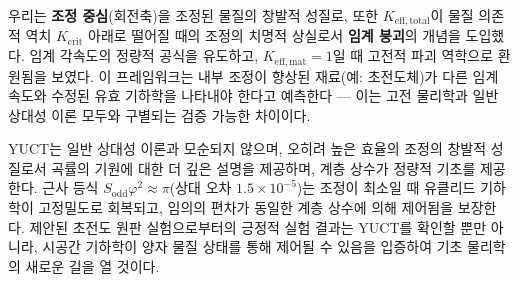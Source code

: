 \documentclass[12pt,a4paper]{article}
\newcommand{\Sodd}{S_{\mathrm{odd}}}
\newcommand{\Keffmat}{K_{\mathrm{eff,mat}}}
\newcommand{\Kefftot}{K_{\mathrm{eff,total}}}
\newcommand{\Kcrit}{K_{\mathrm{crit}}}
\begin{document}
	우리는 \textbf{조정 중심}(회전축)을 조정된 물질의 창발적 성질로, 또한 \(\Kefftot\)이 물질 의존적 역치 \(\Kcrit\) 아래로 떨어질 때의 조정의 치명적 상실로서 \textbf{임계 붕괴}의 개념을 도입했다. 임계 각속도의 정량적 공식을 유도하고, \(\Keffmat=1\)일 때 고전적 파괴 역학으로 환원됨을 보였다. 이 프레임워크는 내부 조정이 향상된 재료(예: 초전도체)가 다른 임계 속도와 수정된 유효 기하학을 나타내야 한다고 예측한다 — 이는 고전 물리학과 일반 상대성 이론 모두와 구별되는 검증 가능한 차이이다.
	
	YUCT는 일반 상대성 이론과 모순되지 않으며, 오히려 높은 효율의 조정의 창발적 성질로서 곡률의 기원에 대한 더 깊은 설명을 제공하며, 계층 상수가 정량적 기초를 제공한다. 근사 등식 \(\Sodd \varphi^2 \approx \pi\)(상대 오차 \(1.5\times10^{-5}\))는 조정이 최소일 때 유클리드 기하학이 고정밀도로 회복되고, 임의의 편차가 동일한 계층 상수에 의해 제어됨을 보장한다. 제안된 초전도 원판 실험으로부터의 긍정적 실험 결과는 YUCT를 확인할 뿐만 아니라, 시공간 기하학이 양자 물질 상태를 통해 제어될 수 있음을 입증하여 기초 물리학의 새로운 길을 열 것이다.
	
\end{document}
